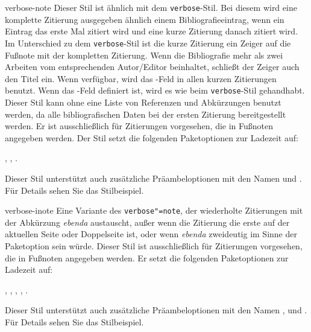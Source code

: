 \documentclass{ltxdockit}[2011/03/25]
\begin{document}
\begin{marglist}
\item[verbose-note] Dieser Stil ist ähnlich mit dem \texttt{verbose}-Stil.
Bei diesem wird eine
komplette Zitierung ausgegeben ähnlich einem Bibliografieeintrag, wenn ein
Eintrag das erste Mal zitiert wird und eine kurze Zitierung danach zitiert wird.
Im Unterschied zu dem \texttt{verbose}-Stil ist die kurze Zitierung ein Zeiger
auf die Fußnote mit der kompletten Zitierung. Wenn die Bibliografie mehr als
zwei Arbeiten vom entsprechenden Autor\slash Editor beinhaltet, schließt der
Zeiger auch den Titel ein. Wenn verfügbar, wird das -Feld
in allen kurzen Zitierungen benutzt. Wenn das -Feld
definiert ist, wird es wie beim \texttt{verbose}-Stil gehandhabt. Dieser Stil
kann ohne eine Liste von Referenzen und Abkürzungen benutzt werden, da alle
bibliografischen Daten bei der ersten Zitierung bereitgestellt werden. Er ist
ausschließlich für Zitierungen vorgesehen, die in Fußnoten angegeben werden. Der
Stil setzt die folgenden Paketoptionen zur Ladezeit auf:

, ,
. 

Dieser Stil unterstützt auch zusätzliche
Präambeloptionen mit den Namen  und . Für Details
sehen Sie das Stilbeispiel. 

\item[verbose-inote] Eine Variante des \texttt{verbose"=note}, der 
wiederholte Zitierungen mit der
Abkürzung \emph{ebenda} austauscht, außer wenn die Zitierung die erste auf der
aktuellen Seite oder Doppelseite ist, oder wenn \emph{ebenda} zweideutig im
Sinne der Paketoption  sein würde. Dieser Stil ist
ausschließlich für Zitierungen vorgesehen, die in Fußnoten angegeben
werden. Er setzt die folgenden Paketoptionen zur Ladezeit auf:

, , , , .

Dieser Stil unterstützt auch zusätzliche
Präambeloptionen mit den Namen ,  und
. Für Details sehen Sie das Stilbeispiel.    


\end{marglist}
\end{document}
